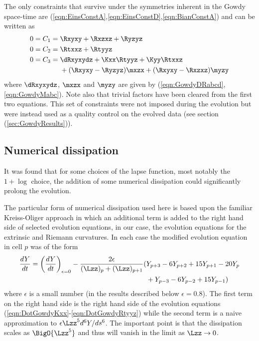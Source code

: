 \documentclass[a4paper,12pt]{article}
\numberwithin{equation}{section}
\begin{document}
The only constraints that survive under the symmetries inherent in the Gowdy space-time
are (\ref{eqn:EinsConstA},\ref{eqn:EinsConstD},\ref{eqn:BianConstA}) and can be written as
\begin{align}
   \label{eqn:GowdyC1}
      0 = C_1 ={}& \Rxyxy+\Rxzxz+\Ryzyz\\
%
   \label{eqn:GowdyC2}
      0 = C_2 ={}& \Rtxxz+\Rtyyz\\
%
   \label{eqn:GowdyC3}
      0 = C_3 ={}&
      \dRxyxydz
      +\Kxx\Rtyyz
      +\Kyy\Rtxxz\notag\\
      &+(\Rxyxy-\Ryzyz)\mxzx
       +(\Rxyxy-\Rxzxz)\myzy
\end{align}
where $\dRxyxydz$, $\mxzx$ and $\myzy$ are given by
(\ref{eqn:GowdyDRabcd},\ref{eqn:GowdyMabc}). Note also that trivial factors have been
cleared from the first two equations. This set of constraints were not imposed during the
evolution but were instead used as a quality control on the evolved data (see section
(\ref{sec:GowdyResults})).

\subsection{Numerical dissipation}
\label{sec:GowdyDissip}

It was found that for some choices of the lapse function, most notably the $1+\log$ choice,
the addition of some numerical dissipation could significantly prolong the evolution.

The particular form of numerical dissipation used here is based upon the familiar
Kreiss-Oliger approach in which an additional term is added to the right hand side of
selected evolution equations, in our case, the evolution equations for the extrinsic and
Riemann curvatures. In each case the modified evolution equation in cell $p$ was of the form
\begin{align}
   \label{eqn:GowdyKODissip}
   \frac{dY}{dt} = \left(\frac{dY}{dt}\right)_{\epsilon=0}
                 - \frac{2\epsilon}{(\Lzz)_{p}+(\Lzz)_{p+1}}
                   (&Y_{p+3}-6Y_{p+2}+15Y_{p+1}-20Y_{p}\notag\\
                    &+Y_{p-3}-6Y_{p-2}+15Y_{p-1})
\end{align}
where $\epsilon$ is a small number (in the results described below $\epsilon=0.8$). The
first term on the right hand side is the right hand side of the evolution equations
(\ref{eqn:DotGowdyKxx}-\ref{eqn:DotGowdyRtyyz}) while the second term is a naive
approximation to $\epsilon\Lzz^5d^6Y/ds^6$. The important point is that the dissipation
scales as $\BigO{\Lzz^5}$ and thus will vanish in the limit as $\Lzz\rightarrow0$.
\end{document}
